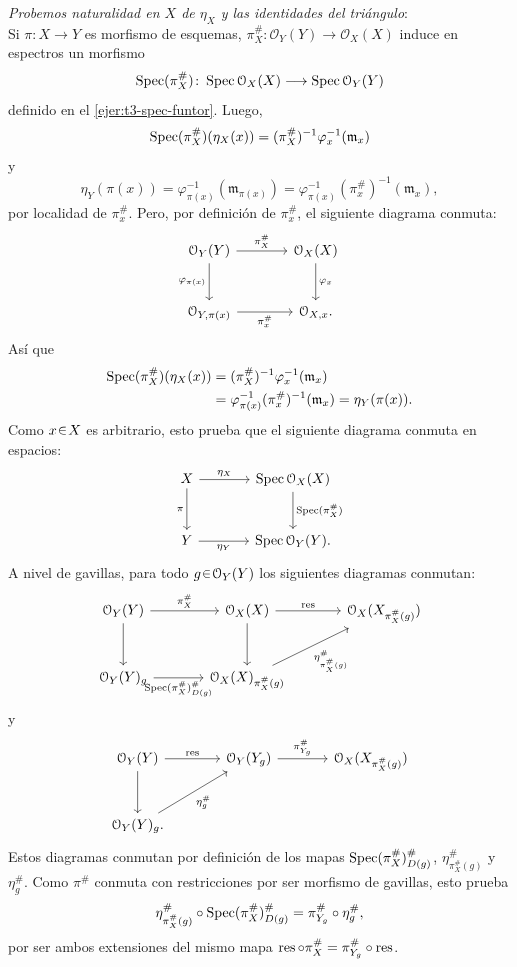 \begin{sol}
\medskip
\noindent\emph{Probemos naturalidad en $X$ de $\eta_X$ y las identidades del triángulo}:\\
Si $\pi\colon X\to Y$ es morfismo de esquemas, $\pi_X^\#\colon\mathcal O_Y(Y)\to\mathcal O_X(X)$ induce en espectros un morfismo
\[
\operatorname{Spec}(\pi_X^\#)\colon\operatorname{Spec}\mathcal O_X(X)\longrightarrow\operatorname{Spec}\mathcal O_Y(Y)
\]
definido en el \cref{ejer:t3-spec-funtor}. Luego,
\[
\operatorname{Spec}(\pi_X^\#)(\eta_X(x))
=(\pi_X^\#)^{-1}\varphi_x^{-1}(\mathfrak m_x)
\]
y
\[
\eta_Y(\pi(x))=\varphi_{\pi(x)}^{-1}(\mathfrak m_{\pi(x)})
=\varphi_{\pi(x)}^{-1}(\pi_x^\#)^{-1}(\mathfrak m_x),
\]
por localidad de $\pi_x^\#$. Pero, por definición de $\pi_x^\#$, el siguiente diagrama conmuta:
\[
\begin{tikzcd}[column sep=large,row sep=large]
\mathcal O_Y(Y)\arrow[r,"\pi_X^\#"]\arrow[d,"\varphi_{\pi(x)}"']
&\mathcal O_X(X)\arrow[d,"\varphi_x"]\\
\mathcal O_{Y,\pi(x)}\arrow[r,"\pi_x^\#"']&\mathcal O_{X,x}.
\end{tikzcd}
\]
Así que
\[
\begin{aligned}
\operatorname{Spec}(\pi_X^\#)(\eta_X(x))
&=(\pi_X^\#)^{-1}\varphi_x^{-1}(\mathfrak m_x)\\
&=\varphi_{\pi(x)}^{-1}(\pi_x^\#)^{-1}(\mathfrak m_x)
=\eta_Y(\pi(x)).
\end{aligned}
\]
Como $x\en X$ es arbitrario, esto prueba que el siguiente diagrama conmuta en espacios:
\begin{equation}\label{eq:t3-naturalidad-unidad}
\begin{tikzcd}[column sep=large,row sep=large]
X\arrow[r,"\eta_X"]\arrow[d,"\pi"']
&\Spec\mathcal O_X(X)\arrow[d,"{\Spec(\pi_X^\#)}"]\\
Y\arrow[r,"\eta_Y"']&\Spec\mathcal O_Y(Y).
\end{tikzcd}
\end{equation}
A nivel de gavillas, para todo $g\en\mathcal O_Y(Y)$ los siguientes diagramas conmutan:
\[
\begin{tikzcd}[column sep=large,row sep=large]
\mathcal O_Y(Y)\arrow[r,"\pi_X^\#"]\arrow[d]
&\mathcal O_X(X)\arrow[r,"\res"]\arrow[d]
&\mathcal O_X(X_{\pi_X^\#(g)})\\
\mathcal O_Y(Y)_g\arrow[r,"{\Spec(\pi_X^\#)^\#_{D(g)}}"']
&\mathcal O_X(X)_{\pi_X^\#(g)}\arrow[ur,"\eta^\#_{\pi_X^\#(g)}"']
\end{tikzcd}
\]
y
\[
\begin{tikzcd}[column sep=large,row sep=large]
\mathcal O_Y(Y)\arrow[r,"\res"]\arrow[d]
&\mathcal O_Y(Y_g)\arrow[r,"\pi^\#_{Y_g}"]
&\mathcal O_X(X_{\pi_X^\#(g)})\\
\mathcal O_Y(Y)_g\arrow[ur,"\eta^\#_g"'].
\end{tikzcd}
\]
Estos diagramas conmutan por definición de los mapas $\operatorname{Spec}(\pi_X^\#)^\#_{D(g)}$, $\eta^\#_{\pi_X^\#(g)}$ y $\eta_g^\#$. Como $\pi^\#$ conmuta con restricciones por ser morfismo de gavillas, esto prueba
\[
\eta^\#_{\pi_X^\#(g)}\circ\operatorname{Spec}(\pi_X^\#)^\#_{D(g)}
=\pi^\#_{Y_g}\circ\eta_g^\#,
\]
por ser ambos extensiones del mismo mapa $\operatorname{res}\circ\pi_X^\#=\pi^\#_{Y_g}\circ\operatorname{res}$.


\end{sol}
